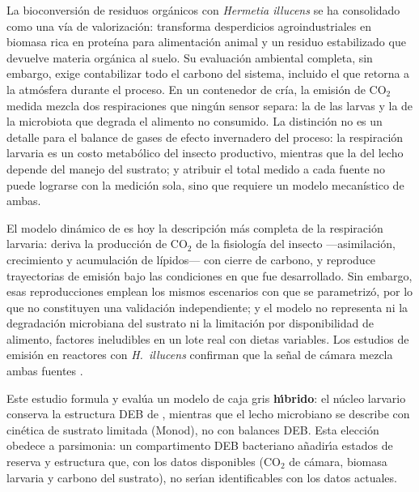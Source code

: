 
La bioconversión de residuos orgánicos con \textit{Hermetia illucens} se ha
consolidado como una vía de valorización: transforma desperdicios
agroindustriales en biomasa rica en proteína para alimentación animal y un
residuo estabilizado que devuelve materia orgánica al suelo. Su evaluación
ambiental completa, sin embargo, exige contabilizar todo el carbono del
sistema, incluido el que retorna a la atmósfera durante el proceso. En un
contenedor de cría, la emisión de CO$_2$ medida mezcla dos respiraciones que
ningún sensor separa: la de las larvas y la de la microbiota que degrada el
alimento no consumido. La distinción no es un detalle para el balance de
gases de efecto invernadero del proceso: la respiración larvaria es un costo
metabólico del insecto productivo, mientras que la del lecho depende del
manejo del sustrato; y atribuir el total medido a cada fuente no puede
lograrse con la medición sola, sino que requiere un modelo mecanístico de
ambas.

El modelo dinámico de \textcite{eriksenDynamicModellingFeed2022} es hoy la
descripción más completa de la respiración larvaria: deriva la producción de
CO$_2$ de la fisiología del insecto ---asimilación, crecimiento y
acumulación de lípidos--- con cierre de carbono, y reproduce trayectorias de
emisión bajo las condiciones en que fue desarrollado. Sin embargo, esas
reproducciones emplean los mismos escenarios con que se parametrizó, por lo
que no constituyen una validación independiente; y el modelo no representa
ni la degradación microbiana del sustrato ni la limitación por
disponibilidad de alimento, factores ineludibles en un lote real con dietas
variables. Los estudios de emisión en reactores con \textit{H.~illucens}
confirman que la señal de cámara mezcla ambas fuentes
\parencite{ermolaevGreenhouseGasEmissions2019,parodiBioconversionEfficienciesGreenhouse2020a}.

Este estudio formula y eval\'{u}a un modelo de caja gris
\textbf{h\'{\i}brido}: el n\'{u}cleo larvario conserva la estructura DEB
de \textcite{eriksenDynamicModellingFeed2022}, mientras que el lecho
microbiano se describe con cin\'{e}tica de sustrato limitada (Monod), no
con balances DEB. Esta elecci\'{o}n obedece a parsimonia: un compartimento
DEB bacteriano a\~{n}adir\'{\i}a estados de reserva y estructura que, con
los datos disponibles (CO$_2$ de c\'{a}mara, biomasa larvaria y carbono
del sustrato), no ser\'{\i}an identificables con los datos actuales.

